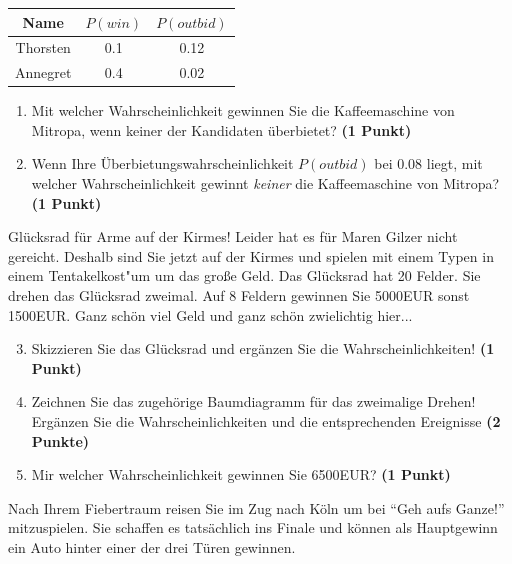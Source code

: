 \documentclass[a4paper, 9pt]{scrartcl}\usepackage[]{graphicx}\usepackage[]{xcolor}
\begin{document}
\begin{center}
\begin{tabular}{ccc}
  \toprule
  Name & $P(win)$ & $P(outbid)$\\
  \midrule
  Thorsten & 0.1 & 0.12\\
  Annegret & 0.4 & 0.02 \\
  \bottomrule
\end{tabular}
\end{center}

\begin{enumerate}
\item Mit welcher Wahrscheinlichkeit gewinnen Sie die Kaffeemaschine von
  Mitropa, wenn keiner der Kandidaten {\"u}berbietet? \textbf{(1 Punkt)}
\item Wenn Ihre {\"U}berbietungswahrscheinlichkeit $P(outbid)$ bei
  0.08 liegt, mit welcher Wahrscheinlichkeit gewinnt
  \textit{keiner} die Kaffeemaschine von Mitropa? \textbf{(1 Punkt)}
\end{enumerate}

Gl{\"u}cksrad f{\"u}r Arme auf der Kirmes! Leider hat es f{\"u}r Maren Gilzer nicht
gereicht. Deshalb sind Sie jetzt auf der Kirmes und spielen mit
einem Typen in einem Tentakelkost{"u}m um das gro{\ss}e Geld. Das Gl{\"u}cksrad hat 20
Felder. Sie drehen das Gl{\"u}cksrad zweimal. Auf 8 Feldern
gewinnen Sie 5000EUR sonst 1500EUR. Ganz sch{\"o}n viel Geld
und ganz sch{\"o}n zwielichtig hier...

\begin{enumerate}
  \setcounter{enumi}{2}  
\item Skizzieren Sie das Gl{\"u}cksrad und erg{\"a}nzen Sie die
  Wahrscheinlichkeiten! \textbf{(1 Punkt)}
\item Zeichnen Sie das zugeh{\"o}rige Baumdiagramm f{\"u}r das zweimalige Drehen!
  Erg{\"a}nzen Sie die Wahrscheinlichkeiten und die entsprechenden Ereignisse
  \textbf{(2 Punkte)}
\item Mir welcher Wahrscheinlichkeit gewinnen Sie 6500EUR? \textbf{(1
    Punkt)}
\end{enumerate}

Nach Ihrem Fiebertraum reisen Sie im Zug nach K{\"o}ln um bei "`Geh aufs
Ganze!"' mitzuspielen. Sie schaffen es tats{\"a}chlich ins Finale und k{\"o}nnen
als Hauptgewinn ein Auto hinter einer der drei T{\"u}ren gewinnen. 
\end{document}
